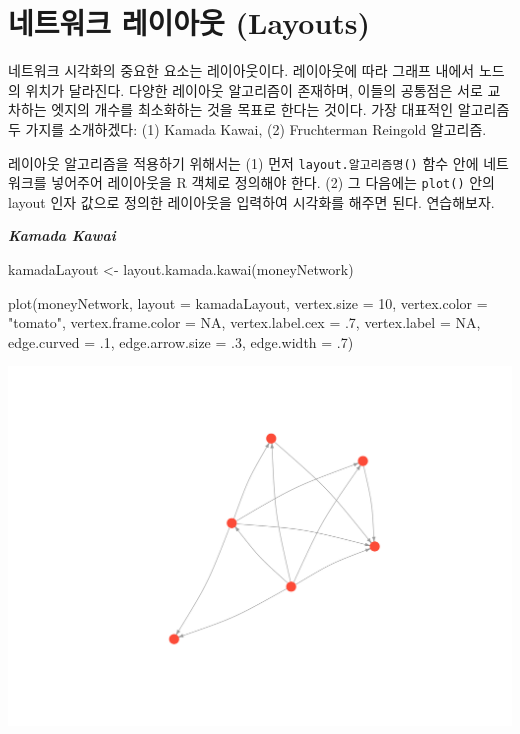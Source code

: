 \documentclass[
]{book}
\newenvironment{Shaded}{\begin{snugshade}}{\end{snugshade}}
\newcommand{\AttributeTok}[1]{\textcolor[rgb]{0.77,0.63,0.00}{#1}}
\newcommand{\ConstantTok}[1]{\textcolor[rgb]{0.00,0.00,0.00}{#1}}
\newcommand{\DecValTok}[1]{\textcolor[rgb]{0.00,0.00,0.81}{#1}}
\newcommand{\FunctionTok}[1]{\textcolor[rgb]{0.00,0.00,0.00}{#1}}
\newcommand{\NormalTok}[1]{#1}
\newcommand{\OtherTok}[1]{\textcolor[rgb]{0.56,0.35,0.01}{#1}}
\newcommand{\StringTok}[1]{\textcolor[rgb]{0.31,0.60,0.02}{#1}}
\begin{document}
\hypertarget{uxb124uxd2b8uxc6ccuxd06c-uxb808uxc774uxc544uxc6c3-layouts}{%
\section{네트워크 레이아웃 (Layouts)}\label{uxb124uxd2b8uxc6ccuxd06c-uxb808uxc774uxc544uxc6c3-layouts}}

네트워크 시각화의 중요한 요소는 레이아웃이다. 레이아웃에 따라 그래프 내에서 노드의 위치가 달라진다. 다양한 레이아웃 알고리즘이 존재하며, 이들의 공통점은 서로 교차하는 엣지의 개수를 최소화하는 것을 목표로 한다는 것이다. 가장 대표적인 알고리즘 두 가지를 소개하겠다: (1) Kamada Kawai, (2) Fruchterman Reingold 알고리즘.

레이아웃 알고리즘을 적용하기 위해서는 (1) 먼저 \texttt{layout.알고리즘명()} 함수 안에 네트워크를 넣어주어 레이아웃을 R 객체로 정의해야 한다. (2) 그 다음에는 \texttt{plot()} 안의 layout 인자 값으로 정의한 레이아웃을 입력하여 시각화를 해주면 된다. 연습해보자.

\textbf{\emph{Kamada Kawai}}

\begin{Shaded}
\begin{Highlighting}[]
\NormalTok{kamadaLayout }\OtherTok{\textless{}{-}} \FunctionTok{layout.kamada.kawai}\NormalTok{(moneyNetwork)}

\FunctionTok{plot}\NormalTok{(moneyNetwork, }\AttributeTok{layout =}\NormalTok{ kamadaLayout, }\AttributeTok{vertex.size =} \DecValTok{10}\NormalTok{, }\AttributeTok{vertex.color =} \StringTok{"tomato"}\NormalTok{, }\AttributeTok{vertex.frame.color =} \ConstantTok{NA}\NormalTok{, }\AttributeTok{vertex.label.cex =}\NormalTok{ .}\DecValTok{7}\NormalTok{,  }\AttributeTok{vertex.label =} \ConstantTok{NA}\NormalTok{, }\AttributeTok{edge.curved =}\NormalTok{ .}\DecValTok{1}\NormalTok{, }\AttributeTok{edge.arrow.size =}\NormalTok{ .}\DecValTok{3}\NormalTok{, }\AttributeTok{edge.width =}\NormalTok{ .}\DecValTok{7}\NormalTok{)}
\end{Highlighting}
\end{Shaded}

\begin{center}\includegraphics[width=0.8\linewidth]{images/9} \end{center}
\end{document}
